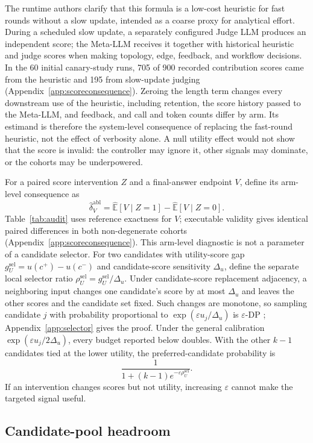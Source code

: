 \documentclass[11pt]{article}
\begin{document}
The runtime authors clarify that this formula is a low-cost heuristic for fast rounds without a slow update, intended as a coarse proxy for analytical effort. During a scheduled slow update, a separately configured Judge LLM produces an independent score; the Meta-LLM receives it together with historical heuristic and judge scores when making topology, edge, feedback, and workflow decisions. In the 60 initial canary-study runs, 705 of 900 recorded contribution scores came from the heuristic and 195 from slow-update judging (Appendix~\ref{app:scoreconsequence}). Zeroing the length term changes every downstream use of the heuristic, including retention, the score history passed to the Meta-LLM, and feedback, and call and token counts differ by arm. Its estimand is therefore the system-level consequence of replacing the fast-round heuristic, not the effect of verbosity alone. A null utility effect would not show that the score is invalid: the controller may ignore it, other signals may dominate, or the cohorts may be underpowered.

For a paired score intervention $Z$ and a final-answer endpoint $V$, define its arm-level consequence as
\[
\widehat\delta_V^{\mathrm{abl}}=
\widehat{\mathbb E}[V\mid Z=1]-\widehat{\mathbb E}[V\mid Z=0].
\]
Table~\ref{tab:audit} uses reference exactness for $V$; executable validity gives identical paired differences in both non-degenerate cohorts (Appendix~\ref{app:scoreconsequence}). This arm-level diagnostic is not a parameter of a candidate selector. For two candidates with utility-score gap $g_U^{\mathrm{sel}}=u(c^+)-u(c^-)$ and candidate-score sensitivity $\Delta_u$, define the separate local selector ratio $\rho_U^{\mathrm{sel}}=g_U^{\mathrm{sel}}/\Delta_u$. Under candidate-score replacement adjacency, a neighboring input changes one candidate's score by at most $\Delta_u$ and leaves the other scores and the candidate set fixed. Such changes are monotone, so sampling candidate $j$ with probability proportional to $\exp(\varepsilon u_j/\Delta_u)$ is $\varepsilon$-DP \citep{mcsherry2007mechanism}; Appendix~\ref{app:selector} gives the proof. Under the general calibration $\exp(\varepsilon u_j/2\Delta_u)$, every budget reported below doubles. With the other $k-1$ candidates tied at the lower utility, the preferred-candidate probability is
\[
\frac{1}{1+(k-1)e^{-\varepsilon\rho_U^{\mathrm{sel}}}}.
\]
If an intervention changes scores but not utility, increasing $\varepsilon$ cannot make the targeted signal useful.

\subsection{Candidate-pool headroom}
\end{document}
